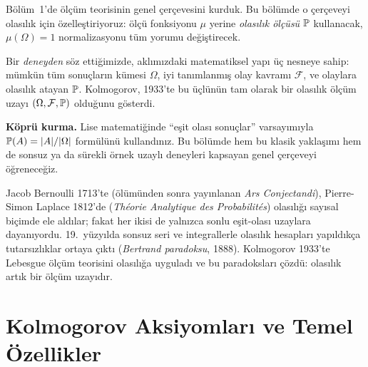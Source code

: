 \begin{motivasyon}
Bölüm~1'de ölçüm teorisinin genel çerçevesini kurduk. Bu bölümde o çerçeveyi
olasılık için özelleştiriyoruz: ölçü fonksiyonu $\mu$ yerine \emph{olasılık
ölçüsü} $\mathbb{P}$ kullanacak, $\mu(\Omega)=1$ normalizasyonu tüm yorumu değiştirecek.

Bir \emph{deneyden} söz ettiğimizde, aklımızdaki matematiksel yapı üç nesneye
sahip: mümkün tüm sonuçların kümesi $\Omega$, iyi tanımlanmış olay kavramı
$\mathcal{F}$, ve olaylara olasılık atayan $\mathbb{P}$. Kolmogorov, 1933'te bu
üçlünün tam olarak bir olasılık ölçüm uzayı $(\Omega,\mathcal{F},\mathbb{P})$
olduğunu gösterdi.

\medskip

\textbf{Köprü kurma.} Lise matematiğinde ``eşit olası sonuçlar'' varsayımıyla
$\mathbb{P}(A) = |A|/|\Omega|$ formülünü kullandınız. Bu bölümde hem bu klasik
yaklaşımı hem de sonsuz ya da sürekli örnek uzaylı deneyleri kapsayan genel
çerçeveyi öğreneceğiz.
\end{motivasyon}

\begin{tarihselnot}
Jacob Bernoulli 1713'te (ölümünden sonra yayınlanan \emph{Ars Conjectandi}),
Pierre-Simon Laplace 1812'de (\emph{Théorie Analytique des Probabilités})
olasılığı sayısal biçimde ele aldılar; fakat her ikisi de yalnızca sonlu
eşit-olası uzaylara dayanıyordu. 19.~yüzyılda sonsuz seri ve integrallerle
olasılık hesapları yapıldıkça tutarsızlıklar ortaya çıktı (\emph{Bertrand
paradoksu}, 1888). Kolmogorov 1933'te Lebesgue ölçüm teorisini olasılığa
uyguladı ve bu paradoksları çözdü: olasılık artık bir ölçüm uzayıdır.
\end{tarihselnot}


\section{Kolmogorov Aksiyomları ve Temel Özellikler}

